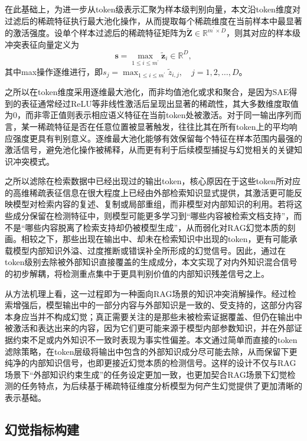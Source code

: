 在此基础上，为进一步从token级表示汇聚为样本级判别向量，本文沿token维度对过滤后的稀疏特征执行最大池化操作，从而提取每个稀疏维度在当前样本中最显著的激活强度。设单个样本过滤后的稀疏特征矩阵为$\widetilde{\mathbf{Z}}\in\mathbb{R}^{m^\prime\times D}$，则其对应的样本级冲突表征向量定义为
\begin{equation}
\mathbf{s}=\max_{1\leq i\leq m^\prime}\tilde{\mathbf{z}}_i\in\mathbb{R}^{D},
\end{equation}
其中max操作逐维进行，即$s_j=\max_{1\leq i\leq m^\prime}\tilde{z}_{i,j},\quad j=1,2,\dots,D$。

之所以在token维度采用逐维最大池化，而非均值池化或求和聚合，是因为SAE得到的表征通常经过ReLU等非线性激活后呈现出显著的稀疏性，其大多数维度取值为$0$，而非零正值则表示相应语义特征在当前token处被激活。对于同一输出序列而言，某一稀疏特征是否在任意位置被显著触发，往往比其在所有token上的平均响应强度更具有判别意义。逐维最大池化能够有效保留每个特征在样本范围内最强的激活信号，避免池化操作被稀释，从而更有利于后续模型捕捉与幻觉相关的关键知识冲突模式。

之所以滤除在检索数据中已经出现过的输出token，核心原因在于这些token所对应的高维稀疏表征信息在很大程度上已经由外部检索知识显式提供，其激活更可能反映模型对检索内容的复述、复制或局部重组，而非模型对内部知识的利用。若将这些成分保留在检测特征中，则模型可能更多学习到“哪些内容被检索文档支持”，而不是“哪些内容脱离了检索支持却仍被模型生成”，从而弱化对RAG幻觉本质的刻画。相较之下，那些出现在输出中、却未在检索知识中出现的token，更有可能承载模型内部知识外溢、过度推断或错误补全所形成的幻觉信号。因此，通过在token级别去除被外部知识直接覆盖的生成成分，本文实现了对内外知识混合信号的初步解耦，将检测重点集中于更具判别价值的内部知识残差信号之上。

从方法机理上看，这一过程即为一种面向RAG场景的知识冲突消解操作。经过检索增强后，模型输出中的一部分内容与外部知识是一致的、受支持的，这部分内容本身应当并不构成幻觉；真正需要关注的是那些未被检索证据覆盖、但仍在输出中被激活和表达出来的内容，因为它们更可能来源于模型内部参数知识，并在外部证据约束不足或内外知识不一致时表现为事实性偏差。本文通过简单而直接的token滤除策略，在token层级将输出中包含的外部知识成分尽可能去除，从而保留下更纯净的内部知识信号，也即更接近幻觉本质的检测信号。这样的设计不仅与RAG场景下“外部知识约束生成”的任务设定更加一致，也更加契合RAG场景下幻觉检测的任务特点，为后续基于稀疏特征维度分析模型为何产生幻觉提供了更加清晰的表示基础。

\subsection{幻觉指标构建}\label{subsec:skid_hallucination_score_definition}

